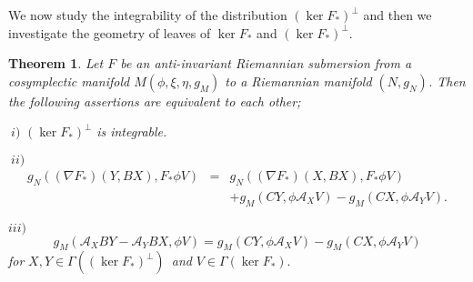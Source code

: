 \documentclass{amsart}
\newtheorem{theorem}{Theorem}
\theoremstyle{plain}
\numberwithin{equation}{section}
\begin{document}
We now study the integrability of the distribution $(\ker F_{\ast })^{\bot }$
and then we investigate the geometry of leaves of $\ker F_{\ast }$ and $(\ker F_{\ast })^{\bot }$.

\begin{theorem}
Let $F$ be an anti-invariant Riemannian submersion from a cosymplectic
manifold $M(\phi ,\xi ,\eta ,g_{M})$ to a Riemannian manifold $(N,g_{N})$.
Then the following assertions are equivalent to each other;
\end{theorem}

$\ i)$ $(\ker F_{\ast })^{\bot }$ \textit{is integrable.}

$\ ii)$ 
\begin{eqnarray*}
g_{N}((\nabla F_{\ast })(Y,BX),F_{\ast }\phi V) &=&g_{N}((\nabla F_{\ast
})(X,BX),F_{\ast }\phi V) \\
&&+g_{M}(CY,\phi \mathcal{A}_{X}V)-g_{M}(CX,\phi \mathcal{A}_{Y}V).
\end{eqnarray*}

$iii)$\begin{equation*}
g_{M}(\mathcal{A}_{X}BY-\mathcal{A}_{Y}BX,\phi V)=g_{M}(CY,\phi \mathcal{A}_{X}V)-g_{M}(CX,\phi \mathcal{A}_{Y}V)
\end{equation*}\textit{for }$X,Y\in \Gamma ((\ker F_{\ast })^{\bot })$\textit{\ and }$V\in
\Gamma (\ker F_{\ast }).$
\end{document}
